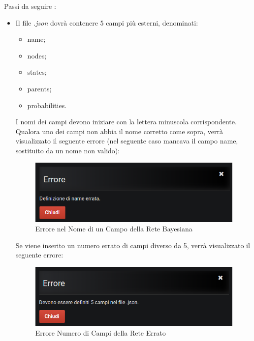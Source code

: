 Passi da seguire :
\begin{itemize}
 \item Il file \textit{.json} dovrà contenere 5 campi più esterni, denominati:
 	\begin{itemize}
 		\item name;
 		\item nodes;
 		\item states;
 		\item parents;
 		\item probabilities.
 	\end{itemize}
 	I nomi dei campi devono iniziare con la lettera minuscola corrispondente. Qualora uno dei campi non abbia il nome corretto come sopra, verrà visualizzato il seguente errore (nel seguente caso mancava il campo name, sostituito da un nome non valido):
 	 
 	\begin{figure}[H]
	\begin{center}
		\includegraphics[scale=0.8]{./images/erroreNomeCampo.png}
		 \caption{Errore nel Nome di un Campo della Rete Bayesiana}	
		 \label{ErrNomeRete}
	\end{center}
\end{figure}

	Se viene inserito un numero errato di campi diverso da 5, verrà visualizzato il seguente errore:
	
	\begin{figure}[H]
	\begin{center}
		\includegraphics[scale=0.8]{./images/wrongNumberOfFields.png}
		 \caption{Errore Numero di Campi della Rete Errato}	
		 \label{ErrNumRete}
	\end{center}
\end{figure}


\end{itemize}
